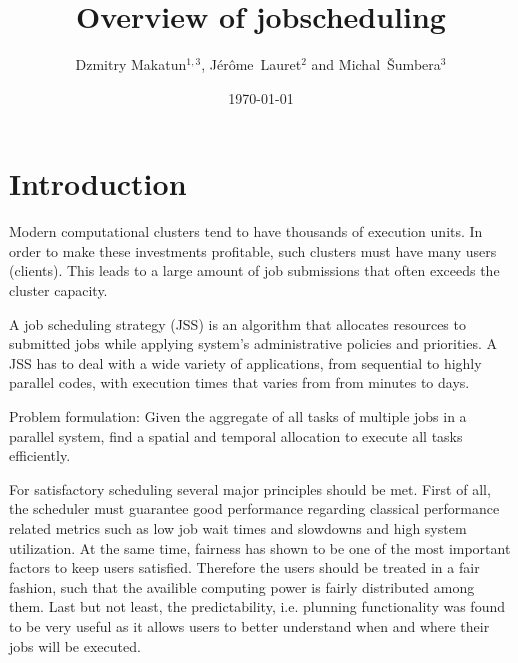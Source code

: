\documentclass[a4paper,10pt]{article}
\begin{document}
\title{Overview of jobscheduling}


\author{Dzmitry Makatun$^{1,3}$, J\'er\^ome~Lauret$^{2}$ and Michal~\v{S}umbera$^{3}$ }



\date{\today}

\maketitle
\begin{abstract}
\end{abstract}

\section{Introduction}

Modern computational clusters tend to have thousands of execution units. In order to make these investments profitable, such clusters must have many users (clients). This leads to a large amount of job submissions that often exceeds the cluster capacity. \cite{FCFS-malleable}

A job scheduling strategy (JSS) is an algorithm that allocates resources to submitted jobs while applying system's administrative policies and priorities. A JSS has to deal with a wide variety of applications, from sequential to highly parallel codes, with execution times that varies from from minutes to days. \cite{FCFS-malleable}

Problem formulation: Given the aggregate of all tasks of multiple jobs in a parallel system, find a spatial and temporal allocation to execute all tasks efficiently. \cite{definition 1999}

For satisfactory scheduling several major principles should be met. First of all, the scheduler must guarantee good performance regarding classical performance related metrics such as low job wait times and slowdowns and high system utilization. At the same time, fairness has shown to be one of the most important factors to keep users satisfied. Therefore the users should be treated in a fair fashion, such that the availible computing power is fairly distributed among them. Last but not least, the predictability, i.e. plunning functionality was found to be very useful as it allows users to better understand when and where their jobs will be executed.  \cite{Rudova 2012}
\end{document}
